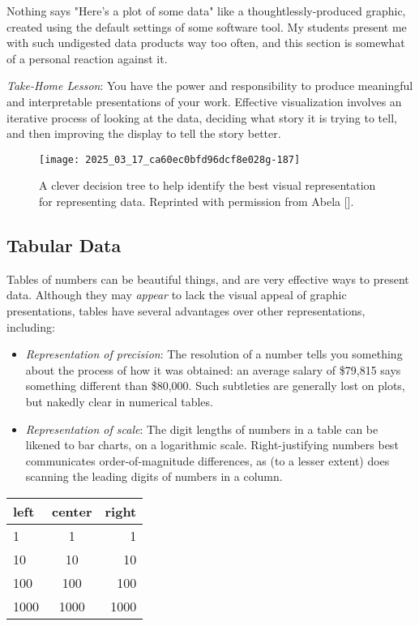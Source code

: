 \documentclass[10pt]{article}
\begin{document}
Nothing says "Here's a plot of some data" like a thoughtlessly-produced graphic, created using the default settings of some software tool. My students present me with such undigested data products way too often, and this section is somewhat of a personal reaction against it.

\emph{Take-Home Lesson}: You have the power and responsibility to produce meaningful and interpretable presentations of your work. Effective visualization involves an iterative process of looking at the data, deciding what story it is trying to tell, and then improving the display to tell the story better.

\begin{figure}[h]
  \centering
  \texttt{[image: 2025\_03\_17\_ca60ec0bfd96dcf8e028g-187]}
  \caption{A clever decision tree to help identify the best visual representation for representing data. Reprinted with permission from Abela [\cite{abela2013advanced}].}
\end{figure}

\subsection{Tabular Data}
Tables of numbers can be beautiful things, and are very effective ways to present data. Although they may \emph{appear} to lack the visual appeal of graphic presentations, tables have several advantages over other representations, including:
\begin{itemize}
  \item \emph{Representation of precision}: The resolution of a number tells you something about the process of how it was obtained: an average salary of \$79,815 says something different than \$80,000. Such subtleties are generally lost on plots, but nakedly clear in numerical tables.
  \item \emph{Representation of scale}: The digit lengths of numbers in a table can be likened to bar charts, on a logarithmic scale. Right-justifying numbers best communicates order-of-magnitude differences, as (to a lesser extent) does scanning the leading digits of numbers in a column.
\end{itemize}

\begin{center}
\begin{tabular}{lcr}
left & center & right \\
\hline
1 & 1 & 1 \\
10 & 10 & 10 \\
100 & 100 & 100 \\
1000 & 1000 & 1000 \\
\hline
\end{tabular}
\end{center}
\end{document}
